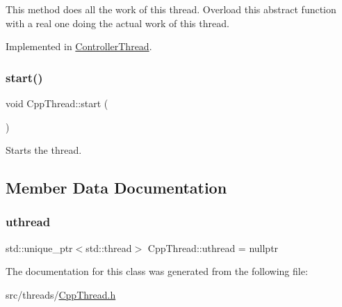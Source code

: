 This method does all the work of this thread. Overload this abstract function with a real one doing the actual work of this thread. 

Implemented in \hyperlink{classControllerThread_ae8206a23ab1a414f2956424def2e759c}{Controller\+Thread}.

\mbox{\label{classCppThread_a1be46d1be000f41a763289300623c609}} 
\subsubsection{\texorpdfstring{start()}{start()}}
{\footnotesize\ttfamily void Cpp\+Thread\+::start (\begin{DoxyParamCaption}{ }\end{DoxyParamCaption})\hspace{0.3cm}{\ttfamily [inline]}}

Starts the thread. 

\subsection{Member Data Documentation}
\mbox{\label{classCppThread_a3136027f60f5054f2a195b7e5fb9f7c9}} 
\subsubsection{\texorpdfstring{uthread}{uthread}}
{\footnotesize\ttfamily std\+::unique\+\_\+ptr$<$std\+::thread$>$ Cpp\+Thread\+::uthread = nullptr\hspace{0.3cm}{\ttfamily [private]}}



The documentation for this class was generated from the following file\+:\begin{DoxyCompactItemize}
\item 
src/threads/\hyperlink{CppThread_8h}{Cpp\+Thread.\+h}\end{DoxyCompactItemize}
